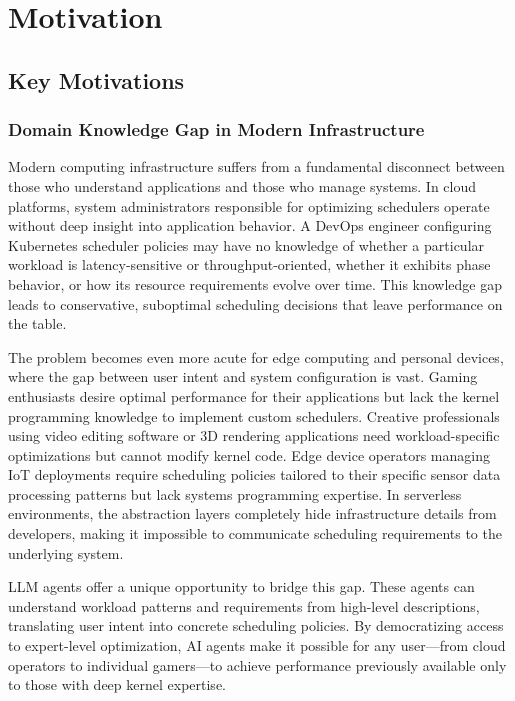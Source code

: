 \section{Motivation}

\subsection{Key Motivations}

\subsubsection{Domain Knowledge Gap in Modern Infrastructure}

Modern computing infrastructure suffers from a fundamental disconnect between those who understand applications and those who manage systems. In cloud platforms, system administrators responsible for optimizing schedulers operate without deep insight into application behavior. A DevOps engineer configuring Kubernetes scheduler policies may have no knowledge of whether a particular workload is latency-sensitive or throughput-oriented, whether it exhibits phase behavior, or how its resource requirements evolve over time. This knowledge gap leads to conservative, suboptimal scheduling decisions that leave performance on the table.

The problem becomes even more acute for edge computing and personal devices, where the gap between user intent and system configuration is vast. Gaming enthusiasts desire optimal performance for their applications but lack the kernel programming knowledge to implement custom schedulers. Creative professionals using video editing software or 3D rendering applications need workload-specific optimizations but cannot modify kernel code. Edge device operators managing IoT deployments require scheduling policies tailored to their specific sensor data processing patterns but lack systems programming expertise. In serverless environments, the abstraction layers completely hide infrastructure details from developers, making it impossible to communicate scheduling requirements to the underlying system.

LLM agents offer a unique opportunity to bridge this gap. These agents can understand workload patterns and requirements from high-level descriptions, translating user intent into concrete scheduling policies. By democratizing access to expert-level optimization, AI agents make it possible for any user—from cloud operators to individual gamers—to achieve performance previously available only to those with deep kernel expertise.

